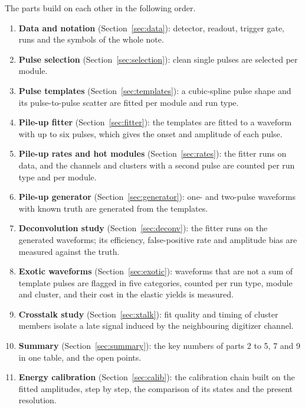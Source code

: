 \documentclass[11pt]{article}
\begin{document}
The parts build on each other in the following order.
\begin{enumerate}
\item \textbf{Data and notation} (Section~\ref{sec:data}): detector, readout, trigger gate, runs and the symbols of the whole note.
\item \textbf{Pulse selection} (Section~\ref{sec:selection}): clean single pulses are selected per module.
\item \textbf{Pulse templates} (Section~\ref{sec:templates}): a cubic-spline pulse shape and its pulse-to-pulse scatter are fitted per module and run type.
\item \textbf{Pile-up fitter} (Section~\ref{sec:fitter}): the templates are fitted to a waveform with up to six pulses, which gives the onset and amplitude of each pulse.
\item \textbf{Pile-up rates and hot modules} (Section~\ref{sec:rates}): the fitter runs on data, and the channels and clusters with a second pulse are counted per run type and per module.
\item \textbf{Pile-up generator} (Section~\ref{sec:generator}): one- and two-pulse waveforms with known truth are generated from the templates.
\item \textbf{Deconvolution study} (Section~\ref{sec:deconv}): the fitter runs on the generated waveforms; its efficiency, false-positive rate and amplitude bias are measured against the truth.
\item \textbf{Exotic waveforms} (Section~\ref{sec:exotic}): waveforms that are not a sum of template pulses are flagged in five categories, counted per run type, module and cluster, and their cost in the elastic yields is measured.
\item \textbf{Crosstalk study} (Section~\ref{sec:xtalk}): fit quality and timing of cluster members isolate a late signal induced by the neighbouring digitizer channel.
\item \textbf{Summary} (Section~\ref{sec:summary}): the key numbers of parts 2 to 5, 7 and 9 in one table, and the open points.
\item \textbf{Energy calibration} (Section~\ref{sec:calib}): the calibration chain built on the fitted amplitudes, step by step, the comparison of its states and the present resolution.
\end{enumerate}
\end{document}
